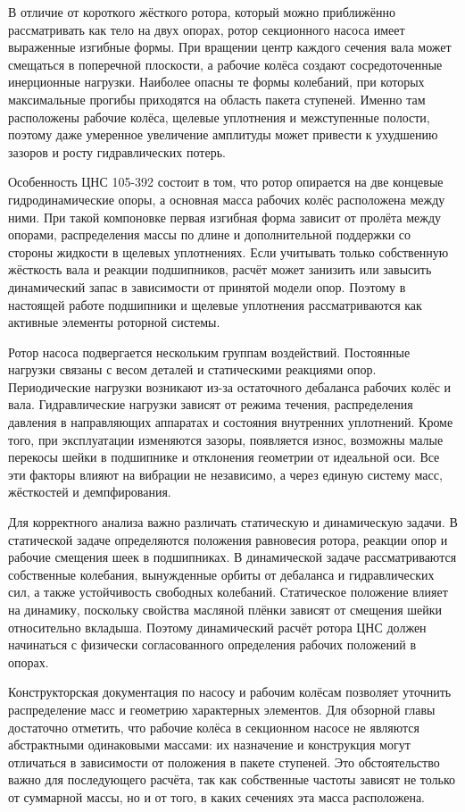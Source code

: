 В отличие от короткого жёсткого ротора, который можно приближённо рассматривать как тело на двух опорах, ротор секционного насоса имеет выраженные изгибные формы. При вращении центр каждого сечения вала может смещаться в поперечной плоскости, а рабочие колёса создают сосредоточенные инерционные нагрузки. Наиболее опасны те формы колебаний, при которых максимальные прогибы приходятся на область пакета ступеней. Именно там расположены рабочие колёса, щелевые уплотнения и межступенные полости, поэтому даже умеренное увеличение амплитуды может привести к ухудшению зазоров и росту гидравлических потерь.

Особенность ЦНС 105-392 состоит в том, что ротор опирается на две концевые гидродинамические опоры, а основная масса рабочих колёс расположена между ними. При такой компоновке первая изгибная форма зависит от пролёта между опорами, распределения массы по длине и дополнительной поддержки со стороны жидкости в щелевых уплотнениях. Если учитывать только собственную жёсткость вала и реакции подшипников, расчёт может занизить или завысить динамический запас в зависимости от принятой модели опор. Поэтому в настоящей работе подшипники и щелевые уплотнения рассматриваются как активные элементы роторной системы.

Ротор насоса подвергается нескольким группам воздействий. Постоянные нагрузки связаны с весом деталей и статическими реакциями опор. Периодические нагрузки возникают из-за остаточного дебаланса рабочих колёс и вала. Гидравлические нагрузки зависят от режима течения, распределения давления в направляющих аппаратах и состояния внутренних уплотнений. Кроме того, при эксплуатации изменяются зазоры, появляется износ, возможны малые перекосы шейки в подшипнике и отклонения геометрии от идеальной оси. Все эти факторы влияют на вибрации не независимо, а через единую систему масс, жёсткостей и демпфирования.

Для корректного анализа важно различать статическую и динамическую задачи. В статической задаче определяются положения равновесия ротора, реакции опор и рабочие смещения шеек в подшипниках. В динамической задаче рассматриваются собственные колебания, вынужденные орбиты от дебаланса и гидравлических сил, а также устойчивость свободных колебаний. Статическое положение влияет на динамику, поскольку свойства масляной плёнки зависят от смещения шейки относительно вкладыша. Поэтому динамический расчёт ротора ЦНС должен начинаться с физически согласованного определения рабочих положений в опорах.

Конструкторская документация по насосу и рабочим колёсам позволяет уточнить распределение масс и геометрию характерных элементов. Для обзорной главы достаточно отметить, что рабочие колёса в секционном насосе не являются абстрактными одинаковыми массами: их назначение и конструкция могут отличаться в зависимости от положения в пакете ступеней. Это обстоятельство важно для последующего расчёта, так как собственные частоты зависят не только от суммарной массы, но и от того, в каких сечениях эта масса расположена.

